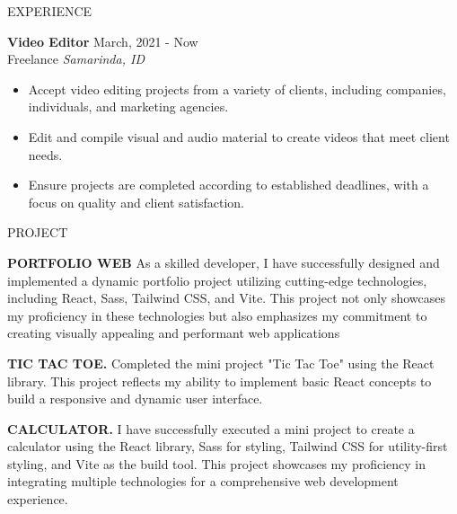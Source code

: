 \documentclass{resume} %
\begin{document}
\begin{rSection}{EXPERIENCE}

\textbf{Video Editor} \hfill March, 2021 - Now\\
Freelance \hfill \textit{Samarinda, ID}
 \begin{itemize}
    \itemsep -3pt {} 
     \item Accept video editing projects from a variety of clients, including companies, individuals, and marketing agencies.
     \item Edit and compile visual and audio material to create videos that meet client needs.
    \item Ensure projects are completed according to established deadlines, with a focus on quality and client satisfaction. 
 \end{itemize}

\end{rSection} 


\begin{rSection}{PROJECT}
\vspace{-1.25em}

\item \textbf{PORTFOLIO WEB} {As a skilled developer, I have successfully designed and implemented a dynamic portfolio project utilizing cutting-edge technologies, including React, Sass, Tailwind CSS, and Vite. This project not only showcases my proficiency in these technologies but also emphasizes my commitment to creating visually appealing and performant web applications}


\item \textbf{TIC TAC TOE.} {Completed the mini project "Tic Tac Toe" using the React library. This project reflects my ability to implement basic React concepts to build a responsive and dynamic user interface.}

\item \textbf{CALCULATOR.} {I have successfully executed a mini project to create a calculator using the React library, Sass for styling, Tailwind CSS for utility-first styling, and Vite as the build tool. This project showcases my proficiency in integrating multiple technologies for a comprehensive web development experience.}

\end{rSection} 
\end{document}
